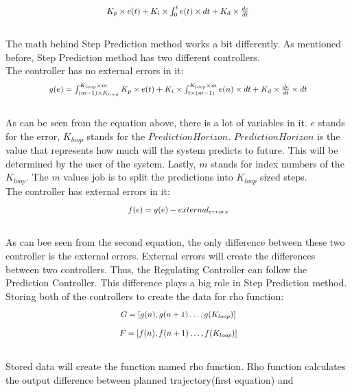 \documentclass[9pt]{article}
\begin{document}
\begin{multicols}{2}
\begin{equation}
    \scalebox{0.85}{$K_p \times e(t) + K_i \times \int_{0}^{t} e(t)\times dt + K_d \times\frac{de}{dt}$}
\end{equation}
\\[0.4mm]
The math behind Step Prediction method works a bit differently. As mentioned before, Step Prediction method has two different controllers.\\[0.4mm]
The controller has no external errors in it:\\[0.4mm]
\begin{equation}
\scalebox{0.85}{$
g(e) = \int_{(m-1)\times K_{loop}}^{K_{loop}\times m} K_p\times e(t) + K_i\times \int_{t\times(m-1)}^{K_{loop}\times m} e(n)\times dt + K_d \times \frac{de}{dt}\times dt$}
\end{equation}\\[0.4mm]
As can be seen from the equation above, there is a lot of variables in it. $e$ stands for the error, $K_{loop}$ stands for the $Prediction Horizon$. $Prediction Horizon$ is the value that represents how much will the system predicts to future. This will
be determined by the user of the system. Lastly, $m$ stands for index numbers of the $K_{loop}$. The $m$ values job is to split the predictions into $K_{loop}$ sized steps.\\[0.4mm]
The controller has external errors in it:\\[0.4mm]
\begin{equation}
    \scalebox{0.85}{$f(e) = g(e) - external_{errors}$}
\end{equation}\\[0.4mm]
As can bee seen from the second equation, the only difference between these two controller is the external errors. External errors will create the differences between two controllers. Thus, the Regulating Controller can follow the Prediction Controller. This difference plays a big role in Step Prediction method.\\[0.4mm]
Storing both of the controllers to create the data for rho function:\\[0.4mm]
\begin{equation}
    \scalebox{0.85}{$G = [ g(n),g(n+1)\dots,g(K_{loop})]$}
\end{equation}
\begin{equation}
    \scalebox{0.85}{$F = [ f(n),f(n+1)\dots,f(K_{loop})]$}
\end{equation}\\[0.4mm]
Stored data will create the function named rho function. Rho function calculates the output difference between planned trajectory(first equation) and

\end{multicols}
\end{document}
